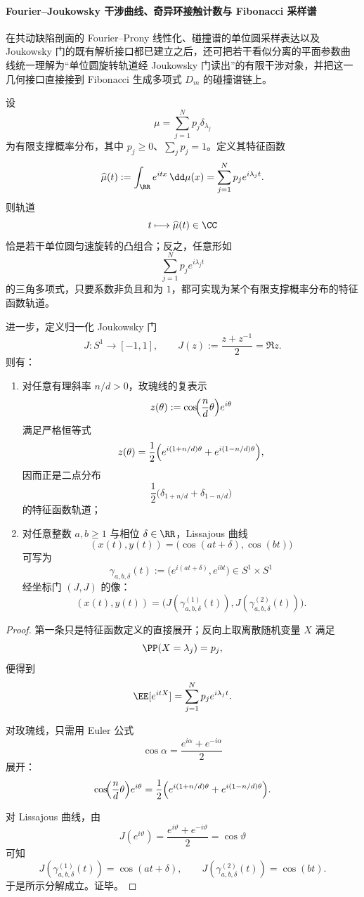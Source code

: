 \paragraph{Fourier--Joukowsky 干涉曲线、奇异环接触计数与 Fibonacci 采样谱}
在共动缺陷剖面的 Fourier--Prony 线性化、碰撞谱的单位圆采样表达以及 Joukowsky 门的既有解析接口都已建立之后，还可把若干看似分离的平面参数曲线统一理解为“单位圆旋转轨道经 Joukowsky 门读出”的有限干涉对象，并把这一几何接口直接接到 Fibonacci 生成多项式 \(D_m\) 的碰撞谱链上。

\begin{theorem}\label{thm:xi-time-part60ae-fourier-joukowsky-generation-principle}
设
\[
\mu=\sum_{j=1}^{N}p_j\delta_{\lambda_j}
\]
为有限支撑概率分布，其中 \(p_j\ge 0\)、\(\sum_j p_j=1\)。定义其特征函数
\[
\widehat\mu(t):=\int_{\RR}e^{itx}\,\dd\mu(x)=\sum_{j=1}^{N}p_j e^{i\lambda_j t}.
\]
则轨道
\[
t\longmapsto \widehat\mu(t)\in\CC
\]
恰是若干单位圆匀速旋转的凸组合；反之，任意形如
\[
\sum_{j=1}^{N}p_j e^{i\lambda_j t}
\]
的三角多项式，只要系数非负且和为 \(1\)，都可实现为某个有限支撑概率分布的特征函数轨道。

进一步，定义归一化 Joukowsky 门
\[
J:S^1\to [-1,1],
\qquad
J(z):=\frac{z+z^{-1}}{2}=\Re z.
\]
则有：
\begin{enumerate}
  \item 对任意有理斜率 \(n/d>0\)，玫瑰线的复表示
  \[
  z(\theta):=\cos\!\Bigl(\frac{n}{d}\theta\Bigr)e^{i\theta}
  \]
  满足严格恒等式
  \[
  z(\theta)=\frac12\Bigl(e^{i(1+n/d)\theta}+e^{i(1-n/d)\theta}\Bigr),
  \]
  因而正是二点分布
  \[
  \frac12\bigl(\delta_{1+n/d}+\delta_{1-n/d}\bigr)
  \]
  的特征函数轨道；
  \item 对任意整数 \(a,b\ge 1\) 与相位 \(\delta\in\RR\)，Lissajous 曲线
  \[
  (x(t),y(t))=\bigl(\cos(at+\delta),\cos(bt)\bigr)
  \]
  可写为
  \[
  \gamma_{a,b,\delta}(t):=\bigl(e^{i(at+\delta)},e^{ibt}\bigr)\in S^1\times S^1
  \]
  经坐标门 \((J,J)\) 的像：
  \[
  (x(t),y(t))
  =
  \bigl(J(\gamma_{a,b,\delta}^{(1)}(t)),J(\gamma_{a,b,\delta}^{(2)}(t))\bigr).
  \]
\end{enumerate}
\end{theorem}
\begin{proof}
第一条只是特征函数定义的直接展开；反向上取离散随机变量 \(X\) 满足
\[
\PP(X=\lambda_j)=p_j,
\]
便得到
\[
\EE[e^{itX}]=\sum_{j=1}^{N}p_j e^{i\lambda_j t}.
\]

对玫瑰线，只需用 Euler 公式
\[
\cos\alpha=\frac{e^{i\alpha}+e^{-i\alpha}}{2}
\]
展开：
\[
\cos\!\Bigl(\frac{n}{d}\theta\Bigr)e^{i\theta}
=
\frac12\Bigl(e^{i(1+n/d)\theta}+e^{i(1-n/d)\theta}\Bigr).
\]

对 Lissajous 曲线，由
\[
J(e^{i\vartheta})=\frac{e^{i\vartheta}+e^{-i\vartheta}}{2}=\cos\vartheta
\]
可知
\[
J(\gamma_{a,b,\delta}^{(1)}(t))=\cos(at+\delta),
\qquad
J(\gamma_{a,b,\delta}^{(2)}(t))=\cos(bt).
\]
于是所示分解成立。证毕。
\end{proof}

